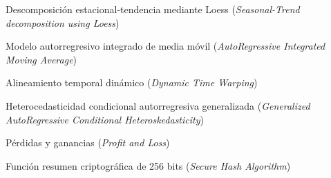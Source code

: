 \begin{description}[align=right,labelwidth=2.5cm]
\item [STL] Descomposición estacional-tendencia mediante Loess (\textit{Seasonal-Trend decomposition using Loess})
\item [ARIMA] Modelo autorregresivo integrado de media móvil (\textit{AutoRegressive Integrated Moving Average})
\item [DTW] Alineamiento temporal dinámico (\textit{Dynamic Time Warping})
\item [GARCH] Heterocedasticidad condicional autorregresiva generalizada (\textit{Generalized AutoRegressive Conditional Heteroskedasticity})
\item [PnL] Pérdidas y ganancias (\textit{Profit and Loss})
\item [SHA-256] Función resumen criptográfica de 256 bits (\textit{Secure Hash Algorithm})
\end{description}

